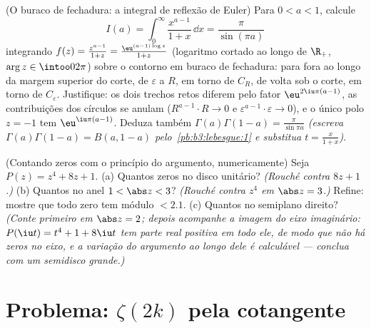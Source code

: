 \begin{exercise}[$\star\star\star$]\label{exo:b3:residues:11}
(O buraco de fechadura: a integral de reflexão de Euler) Para $0 < a < 1$,
calcule
\[
I(a) = \int_0^{\infty}\frac{x^{a-1}}{1 + x}\,\dd x =
\frac{\pi}{\sin(\pi a)}
\]
integrando $f(z) = \frac{z^{a-1}}{1+z} =
\frac{\eu^{(a-1)\log z}}{1 + z}$ (logaritmo cortado ao longo de $\R_+$, $\arg z \in \intoo0{2\pi}$) sobre
o contorno em buraco de fechadura: para fora ao longo da margem
superior do corte, de $\varepsilon$ a $R$, em torno de $C_R$, de volta
sob o corte, em torno de $C_\varepsilon$. Justifique: os dois trechos retos
diferem pelo fator $\eu^{2\iu\pi(a-1)}$, as contribuições dos círculos se anulam
($R^{a-1}\cdot R \to 0$ e $\varepsilon^{a-1}\cdot\varepsilon \to 0$), e o único polo $z = -1$ tem  $\eu^{\iu\pi(a - 1)}$. Deduza
também $\Gamma(a)\Gamma(1 - a) = \frac\pi{\sin\pi a}$ \emph{(escreva $\Gamma(a)\Gamma(1-a) = B(a, 1-a)$ pelo~\cref{pb:b3:lebesgue:1} e substitua $t =
\frac{x}{1+x}$)}.
\end{exercise}

\begin{exercise}[$\star\star$]\label{exo:b3:residues:12}
(Contando zeros com o princípio do argumento, numericamente) Seja
$P(z) = z^4 + 8z + 1$.
(a) Quantos zeros no disco unitário? \emph{(Rouché contra
$8z + 1$.)}
(b) Quantos no anel $1 < \abs z < 3$? \emph{(Rouché contra $z^4$ em $\abs z = 3$.)}
Refine: mostre que todo zero tem módulo $< 2.1$.
(c) Quantos no semiplano direito? \emph{(Conte primeiro em $\abs z = 2$; depois
acompanhe a imagem do eixo imaginário: $P(\iu t) = t^4 + 1 + 8\iu t$ tem parte real positiva em
todo ele, de modo que não há zeros no eixo, e a variação do argumento
ao longo dele é calculável --- conclua com um semidisco grande.)}
\end{exercise}

\section{Problema: \texorpdfstring{$\zeta(2k)$}{zeta(2k)} pela cotangente}


